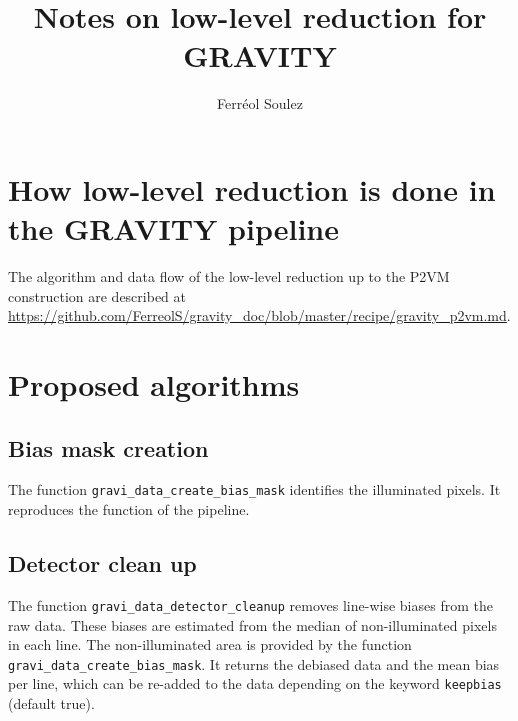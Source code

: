 \documentclass[a4paper,11pt,twoside]{scrartcl}
\author{Ferréol Soulez}
\title{Notes on low-level reduction for GRAVITY}
\begin{document}
\maketitle
\section{How low-level reduction is done in the GRAVITY pipeline}

The algorithm and data flow of the low-level reduction up to the P2VM construction are described at \url{https://github.com/FerreolS/gravity_doc/blob/master/recipe/gravity_p2vm.md}.

\section{Proposed algorithms}

\subsection{Bias mask creation}

The function \verb|gravi_data_create_bias_mask| identifies the illuminated pixels. It reproduces the function of the pipeline.

\subsection{Detector clean up}
The function \verb|gravi_data_detector_cleanup| removes line-wise biases from the raw data. These biases are estimated from the median of non-illuminated pixels in each line. The non-illuminated area is provided by the function \verb|gravi_data_create_bias_mask|. It returns the debiased data and the mean bias per line, which can be re-added to the data depending on the keyword \verb+keepbias+ (default true).
\end{document}
